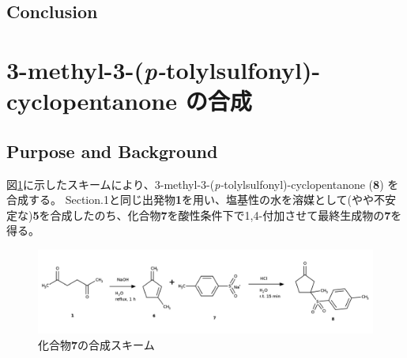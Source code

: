\documentclass{ltjsarticle}
\theoremstyle{definition}
\numberwithin{equation}{section}
\begin{document}
\subsection{Conclusion}

\section{3-methyl-3-(\textit{p-}tolylsulfonyl)-cyclopentanone の合成}
\subsection{Purpose and Background}
図\ref{scheme_6-2}に示したスキームにより、3-methyl-3-(\textit{p-}tolylsulfonyl)-cyclopentanone (\textbf{8}) を合成する。
Section.1と同じ出発物\textbf{1}を用い、塩基性の水を溶媒として(やや不安定な)\textbf{5}を合成したのち、化合物\textbf{7}を酸性条件下で1,4-付加させて最終生成物の\textbf{7}を得る。
\begin{figure}[htbp]
\begin{center}
\includegraphics[width = 15 cm]{scheme6-2.png}
\caption{化合物\textbf{7}の合成スキーム}%
\label{scheme_6-2}
\end{center}
\end{figure}
\end{document}
